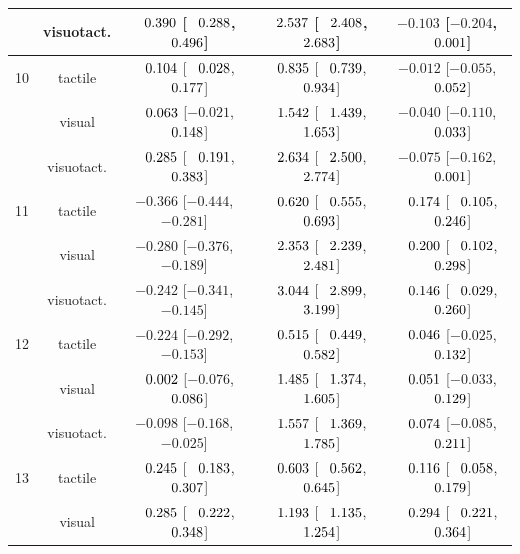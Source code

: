 \begin{longtable}{lcccc}
 & visuotact. & $\hphantom{-}0.390$ [$\hphantom{-}0.288$, $\hphantom{-}0.496$] & $\hphantom{-}2.537$ [$\hphantom{-}2.408$, $\hphantom{-}2.683$] & \cellcolor{gray!15}$-0.103$ [$-0.204$, $\hphantom{-}0.001$] \\
\midrule
10 & tactile & $\hphantom{-}0.104$ [$\hphantom{-}0.028$, $\hphantom{-}0.177$] & $\hphantom{-}0.835$ [$\hphantom{-}0.739$, $\hphantom{-}0.934$] & $-0.012$ [$-0.055$, $\hphantom{-}0.052$] \\
 & visual & $\hphantom{-}0.063$ [$-0.021$, $\hphantom{-}0.148$] & $\hphantom{-}1.542$ [$\hphantom{-}1.439$, $\hphantom{-}1.653$] & $-0.040$ [$-0.110$, $\hphantom{-}0.033$] \\
 & visuotact. & $\hphantom{-}0.285$ [$\hphantom{-}0.191$, $\hphantom{-}0.383$] & $\hphantom{-}2.634$ [$\hphantom{-}2.500$, $\hphantom{-}2.774$] & $-0.075$ [$-0.162$, $\hphantom{-}0.001$] \\
\midrule
11 & tactile & $-0.366$ [$-0.444$, $-0.281$] & $\hphantom{-}0.620$ [$\hphantom{-}0.555$, $\hphantom{-}0.693$] & $\hphantom{-}0.174$ [$\hphantom{-}0.105$, $\hphantom{-}0.246$] \\
 & visual & $-0.280$ [$-0.376$, $-0.189$] & $\hphantom{-}2.353$ [$\hphantom{-}2.239$, $\hphantom{-}2.481$] & $\hphantom{-}0.200$ [$\hphantom{-}0.102$, $\hphantom{-}0.298$] \\
 & visuotact. & $-0.242$ [$-0.341$, $-0.145$] & $\hphantom{-}3.044$ [$\hphantom{-}2.899$, $\hphantom{-}3.199$] & $\hphantom{-}0.146$ [$\hphantom{-}0.029$, $\hphantom{-}0.260$] \\
\midrule
12 & tactile & $-0.224$ [$-0.292$, $-0.153$] & $\hphantom{-}0.515$ [$\hphantom{-}0.449$, $\hphantom{-}0.582$] & $\hphantom{-}0.046$ [$-0.025$, $\hphantom{-}0.132$] \\
 & visual & $\hphantom{-}0.002$ [$-0.076$, $\hphantom{-}0.086$] & $\hphantom{-}1.485$ [$\hphantom{-}1.374$, $\hphantom{-}1.605$] & $\hphantom{-}0.051$ [$-0.033$, $\hphantom{-}0.129$] \\
 & visuotact. & $-0.098$ [$-0.168$, $-0.025$] & $\hphantom{-}1.557$ [$\hphantom{-}1.369$, $\hphantom{-}1.785$] & $\hphantom{-}0.074$ [$-0.085$, $\hphantom{-}0.211$] \\
\midrule
13 & tactile & $\hphantom{-}0.245$ [$\hphantom{-}0.183$, $\hphantom{-}0.307$] & $\hphantom{-}0.603$ [$\hphantom{-}0.562$, $\hphantom{-}0.645$] & \cellcolor{gray!15}$\hphantom{-}0.116$ [$\hphantom{-}0.058$, $\hphantom{-}0.179$] \\
 & visual & $\hphantom{-}0.285$ [$\hphantom{-}0.222$, $\hphantom{-}0.348$] & $\hphantom{-}1.193$ [$\hphantom{-}1.135$, $\hphantom{-}1.254$] & \cellcolor{gray!15}$\hphantom{-}0.294$ [$\hphantom{-}0.221$, $\hphantom{-}0.364$] \\

\end{longtable}

